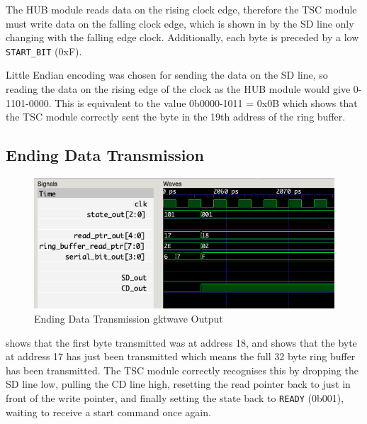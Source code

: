 The HUB module reads data on the rising clock edge, therefore the TSC module must write data on the falling clock edge, which is shown in  by the SD line only changing with the falling edge clock.
Additionally, each byte is preceded by a low \texttt{START\_BIT} (0xF).

Little Endian encoding was chosen for sending the data on the SD line, so reading the data on the rising edge of the clock as the HUB module would give 0-1101-0000.
This is equivalent to the value 0b0000-1011 = 0x0B which shows that the TSC module correctly sent the byte in the 19th address of the ring buffer.

\subsection{Ending Data Transmission}
\begin{figure}[H]
    \centering
    \includegraphics[width=\columnwidth]{Figures/Jtransmit_end}
    \caption{Ending Data Transmission gktwave Output}
    \label{fig:testJ}
\end{figure}

 shows that the first byte transmitted was at address 18, and  shows that the byte at address 17 has just been transmitted which means the full 32 byte ring buffer has been transmitted.
The TSC module correctly recognises this by dropping the SD line low, pulling the CD line high, resetting the read pointer back to just in front of the write pointer, and finally setting the state back to \texttt{READY} (0b001), waiting to receive a start command once again.